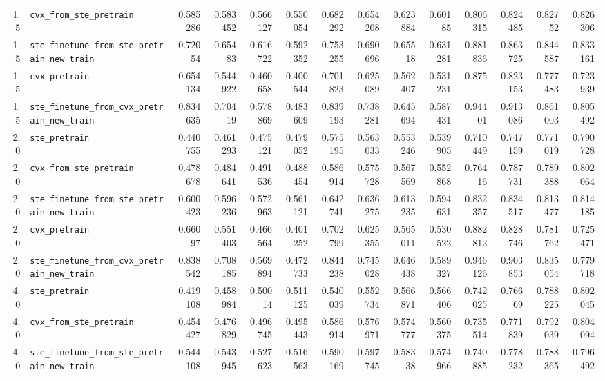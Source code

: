 \begin{longtable}{@{}r l *{12}{r}@{}}
1.5 & \texttt{cvx\_from\_ste\_pretrain} & 0.585286 & 0.583452 & 0.566127 & 0.550054 & 0.682292 & 0.654208 & 0.623884 & 0.60185 & 0.806315 & 0.824485 & 0.82752 & 0.826306 \\
1.5 & \texttt{ste\_finetune\_from\_ste\_pretrain\_new\_train} & 0.72054 & 0.65483 & 0.616722 & 0.592352 & 0.753255 & 0.690696 & 0.65518 & 0.631281 & 0.881836 & 0.863725 & 0.844587 & 0.833161 \\
1.5 & \texttt{cvx\_pretrain} & 0.654134 & 0.544922 & 0.460658 & 0.400544 & 0.701823 & 0.625089 & 0.562407 & 0.531231 & 0.875 & 0.823153 & 0.777483 & 0.723939 \\
1.5 & \texttt{ste\_finetune\_from\_cvx\_pretrain\_new\_train} & 0.834635 & 0.70419 & 0.578869 & 0.483609 & 0.839193 & 0.738281 & 0.645694 & 0.587431 & 0.94401 & 0.913086 & 0.861003 & 0.805492 \\
2.0 & \texttt{ste\_pretrain} & 0.440755 & 0.461293 & 0.475121 & 0.479052 & 0.575195 & 0.563033 & 0.553246 & 0.539905 & 0.710449 & 0.747159 & 0.771019 & 0.790728 \\
2.0 & \texttt{cvx\_from\_ste\_pretrain} & 0.478678 & 0.484641 & 0.491536 & 0.488454 & 0.586914 & 0.575728 & 0.567569 & 0.552868 & 0.76416 & 0.787731 & 0.789388 & 0.802064 \\
2.0 & \texttt{ste\_finetune\_from\_ste\_pretrain\_new\_train} & 0.600423 & 0.596236 & 0.572963 & 0.561121 & 0.642741 & 0.636275 & 0.613235 & 0.594631 & 0.832357 & 0.834517 & 0.813477 & 0.814185 \\
2.0 & \texttt{cvx\_pretrain} & 0.66097 & 0.551403 & 0.466564 & 0.401252 & 0.702799 & 0.625355 & 0.565011 & 0.530522 & 0.882812 & 0.828746 & 0.781762 & 0.725471 \\
2.0 & \texttt{ste\_finetune\_from\_cvx\_pretrain\_new\_train} & 0.838542 & 0.708185 & 0.569894 & 0.472733 & 0.844238 & 0.745028 & 0.646438 & 0.589327 & 0.946126 & 0.903853 & 0.835054 & 0.779718 \\
4.0 & \texttt{ste\_pretrain} & 0.419108 & 0.458984 & 0.50014 & 0.511125 & 0.540039 & 0.552734 & 0.566871 & 0.566406 & 0.742025 & 0.76669 & 0.788225 & 0.802045 \\
4.0 & \texttt{cvx\_from\_ste\_pretrain} & 0.454427 & 0.476829 & 0.496745 & 0.495443 & 0.586914 & 0.576971 & 0.574777 & 0.560375 & 0.735514 & 0.771839 & 0.792039 & 0.804094 \\
4.0 & \texttt{ste\_finetune\_from\_ste\_pretrain\_new\_train} & 0.544108 & 0.543945 & 0.527623 & 0.516563 & 0.590169 & 0.597745 & 0.58338 & 0.574966 & 0.740885 & 0.778232 & 0.788365 & 0.796492 \\

\end{longtable}
